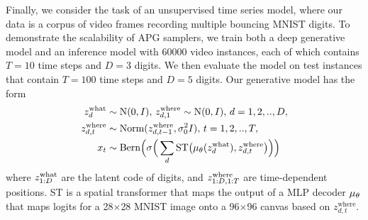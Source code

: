 \documentclass{article}
\theoremstyle{definition}
\begin{document}
Finally, we consider the task of an unsupervised time series model, where our data is a corpus of video frames recording multiple bouncing MNIST digits. To demonstrate the scalability of APG samplers, we train both a deep generative model and an inference model with $60000$ video instances, each of which contains $T=10$ time steps and $D=3$ digits.  We then evaluate the model on test instances that contain $T=100$ time steps and $D=5$ digits. Our generative model has the form
\begin{align*}
    z^{\mathrm{what}}_{d} 
    &\sim 
    \text{N}(0, I)
    ,
    \,
    z^{\mathrm{where}}_{d, 1} \sim \text{N}(0, I)
    ,
    \,
    d=1, 2,.., D,
    \\
    z^{\mathrm{where}}_{d, t} 
    &\sim 
    \text{Norm}(z^{\mathrm{where}}_{d, t - 1}, \sigma^2_0 I),
    \,
    t=1, 2,.., T,   
    \\
    x_t 
    &\sim
    \mathrm{Bern}
    \Big(
        \sigma
        \Big(
            \sum_{d} \mathrm{ST}
            \big(
                \mu_\theta(z^{\mathrm{what}}_d), 
                z^{\mathrm{where}}_{d, t}
            \big)
        \Big)
    \Big)
\end{align*}
where $z_{1:D}^{\mathrm{what}}$ are the latent code of digits, and $z_{1:D, 1:T}^{\mathrm{where}}$ are time-dependent positions. ST is a spatial transformer \cite{jaderberg2015spatial} that maps the output of a MLP decoder $\mu_\theta$ that maps logits for a 28$\times$28 MNIST image onto a 96$\times$96 canvas based on $z^{\mathrm{where}}_{d, t}$. 
\end{document}
